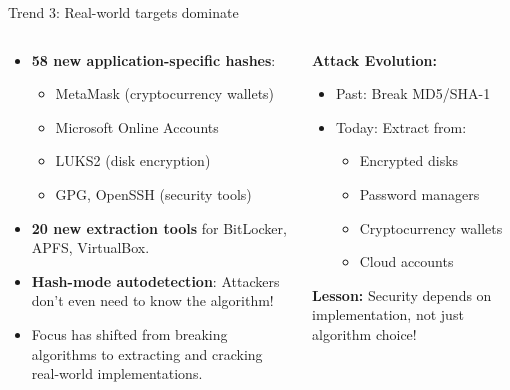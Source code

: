 \documentclass[aspectratio=169, lualatex, handout]{beamer}
\begin{document}
\begin{frame}{Trend 3: Real-world targets dominate}
	\begin{columns}[c]
		\begin{column}{0.55\textwidth}
			\begin{itemize}
				\item \textbf{58 new application-specific hashes}:
				      \begin{itemize}
					      \item MetaMask (cryptocurrency wallets)
					      \item Microsoft Online Accounts
					      \item LUKS2 (disk encryption)
					      \item GPG, OpenSSH (security tools)
				      \end{itemize}
				\item \textbf{20 new extraction tools} for BitLocker, APFS, VirtualBox.
				\item \textbf{Hash-mode autodetection}: Attackers don't even need to know the algorithm!
				\item Focus has shifted from breaking algorithms to extracting and cracking real-world implementations.
			\end{itemize}
		\end{column}
		\begin{column}{0.45\textwidth}
			\begin{tcolorbox}[colback=black!5!white,colframe=ciphergray]
				\textbf{Attack Evolution:}
				\begin{itemize}
					\item Past: Break MD5/SHA-1
					\item Today: Extract from:
					      \begin{itemize}
						      \small
						      \item Encrypted disks
						      \item Password managers
						      \item Cryptocurrency wallets
						      \item Cloud accounts
					      \end{itemize}
				\end{itemize}
				\textcolor{cipherprimary}{\textbf{Lesson:} \small Security depends on implementation, not just algorithm choice!}
			\end{tcolorbox}
		\end{column}
	\end{columns}
\end{frame}
\end{document}
